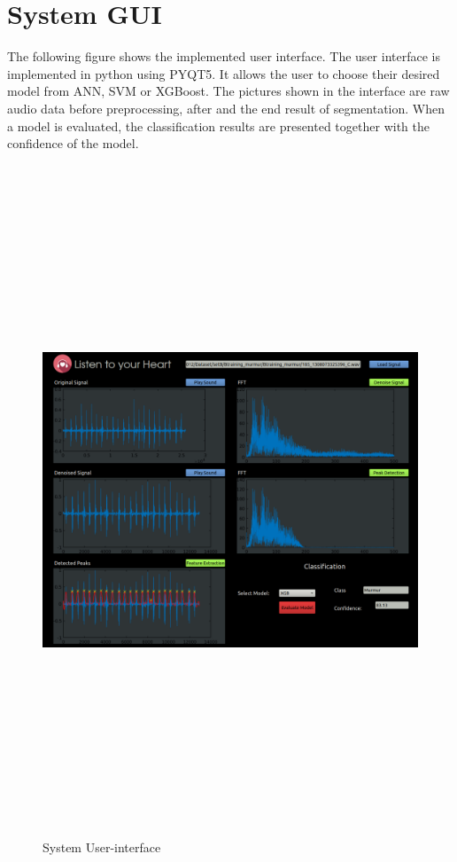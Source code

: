 \documentclass[10pt,twocolumn]{witseiepaper}
\begin{document}
\onecolumn
\newpage
\section{System GUI}
\label{gee}
The following figure shows the implemented user interface. The user interface is implemented in python using PYQT5. It allows the user to choose their desired model from ANN, SVM or XGBoost. The pictures shown in the interface are raw audio data before preprocessing, after and the end result of segmentation. When a model is evaluated, the classification results are presented together with the confidence of the model.


\begin{figure}[h!]
    \centering
    \includegraphics[width = 18cm, height = 20cm] {GUI.png}
    \caption{System User-interface}
    \label{gui}
\end{figure}{}
\newpage
\onecolumn





\end{document}
